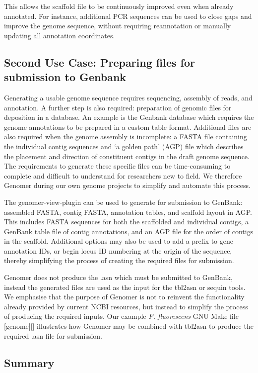 \documentclass[10pt]{article}
\begin{document}
This allows the scaffold file to be continuously improved even when already
annotated. For instance, additional PCR sequences can be used to close gaps and
improve the genome sequence, without requiring reannotation or manually
updating all annotation coordinates.

\subsection*{Second Use Case: Preparing files for submission to Genbank}

Generating a usable genome sequence requires sequencing, assembly of reads, and
annotation. A further step is also required: preparation of genomic files for
deposition in a database. An example is the Genbank database which requires the
genome annotations to be prepared in a custom table format. Additional files
are also required when the genome assembly is incomplete: a FASTA file
containing the individual contig sequences and `a golden path' (AGP)
\cite{agp-spec} file which describes the placement and direction of constituent
contigs in the draft genome sequence. The requirements to generate these
specific files can be time-consuming to complete and difficult to understand
for researchers new to field. We therefore Genomer during our own genome
projects to simplify and automate this process.

The genomer-view-plugin can be used to generate for submission to GenBank:
assembled FASTA, contig FASTA, annotation tables, and scaffold layout in AGP.
This includes FASTA sequences for both the scaffolded and individual contigs, a
GenBank table file of contig annotations, and an AGP file for the order of
contigs in the scaffold. Additional options may also be used to add a prefix to
gene annotation IDs, or begin locus ID numbering at the origin of the sequence,
thereby simplifying the process of creating the required files for submission.

Genomer does not produce the .asn which must be submitted to GenBank, instead
the generated files are used as the input for the tbl2asn or sequin tools. We
emphasise that the purpose of Genomer is not to reinvent the functionality
already provided by current NCBI resources, but instead to simplify the process
of producing the required inputs. Our example \emph{P. fluorescens} GNU Make
file [genome][] illustrates how Genomer may be combined with tbl2asn to produce
the required .asn file for submission.

\subsection*{Summary}
\end{document}
